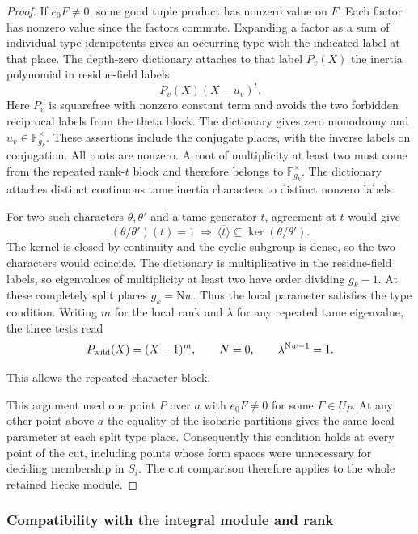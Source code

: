 \begin{proof}
If \(e_0F\ne0\), some good tuple product has nonzero
value on \(F\). Each factor has nonzero value since the
factors commute. Expanding a factor as a sum of individual
type idempotents gives an occurring type with the indicated
label at that place. The depth-zero dictionary attaches to
that label \(P_v(X)\) the inertia polynomial in residue-field
labels
\[
                         P_v(X)(X-u_v)^t .
\]
Here \(P_v\) is squarefree with nonzero constant term and
avoids the two forbidden reciprocal labels from the theta
block. The dictionary gives zero monodromy and
\(u_v\in\mathbb F_{g_k}^{\times}\). These assertions include
the conjugate places, with the inverse labels on conjugation.
All roots are nonzero. A root of multiplicity at least two
must come from the repeated rank-\(t\) block and therefore
belongs to \(\mathbb F_{g_k}^{\times}\). The dictionary attaches
distinct continuous tame inertia characters to distinct
nonzero labels.

For two such characters \(\theta,\theta'\) and a tame generator
\(t\), agreement at \(t\) would give
\[
 (\theta/\theta')(t)=1\ \Longrightarrow\
 \overline{\langle t\rangle}\subseteq\ker(\theta/\theta').
\]
The kernel is closed by continuity and the cyclic subgroup is dense,
so the two characters would coincide. The dictionary is
multiplicative in the residue-field labels, so eigenvalues
of multiplicity at least two have order dividing \(g_k-1\).
At these completely split places \(g_k=\mathrm Nw\). Thus the local parameter satisfies the type condition. Writing \(m\) for the local rank and \(\lambda\) for any repeated tame eigenvalue, the three tests read
\[
 P_{\rm wild}(X)=(X-1)^m,\qquad N=0,\qquad \lambda^{\mathrm Nw-1}=1.
\]

This allows the repeated character block.

This argument used one point \(P\) over \(a\) with \(e_0F\ne0\) for some \(F\in U_P\).
At any other point above \(a\) the equality of the isobaric
partitions gives the same local parameter at each split
type place. Consequently this condition holds at every point of the cut, including points whose form spaces were unnecessary for deciding membership in \(S_i\). The cut comparison
therefore applies to the whole retained Hecke module.
\end{proof}

\subsubsection*{Compatibility with the integral module and rank}

